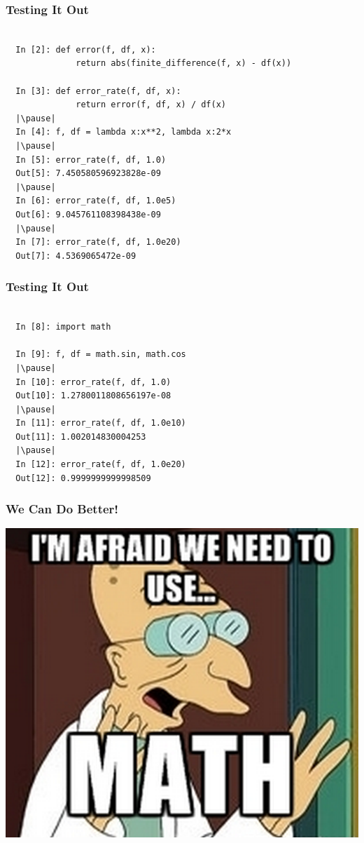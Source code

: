 \documentclass{beamer}
\begin{document}
\begin{frame}[fragile]
\frametitle{Testing It Out}

\begin{lstlisting}

  In [2]: def error(f, df, x):
              return abs(finite_difference(f, x) - df(x))

  In [3]: def error_rate(f, df, x):
              return error(f, df, x) / df(x)
  |\pause|
  In [4]: f, df = lambda x:x**2, lambda x:2*x
  |\pause|
  In [5]: error_rate(f, df, 1.0)
  Out[5]: 7.450580596923828e-09
  |\pause|
  In [6]: error_rate(f, df, 1.0e5)
  Out[6]: 9.045761108398438e-09
  |\pause|
  In [7]: error_rate(f, df, 1.0e20)
  Out[7]: 4.5369065472e-09
\end{lstlisting}

\end{frame}

\begin{frame}[fragile]
\frametitle{Testing It Out}

\begin{lstlisting}

  In [8]: import math

  In [9]: f, df = math.sin, math.cos
  |\pause|
  In [10]: error_rate(f, df, 1.0)
  Out[10]: 1.2780011808656197e-08
  |\pause|
  In [11]: error_rate(f, df, 1.0e10)
  Out[11]: 1.002014830004253
  |\pause|
  In [12]: error_rate(f, df, 1.0e20)
  Out[12]: 0.9999999999998509
\end{lstlisting}

\end{frame}

\begin{frame}
\frametitle{We Can Do Better!}
\pause
\begin{center}
  \includegraphics[scale=0.5]{use-math.png}
\end{center}

\end{frame}
\end{document}
